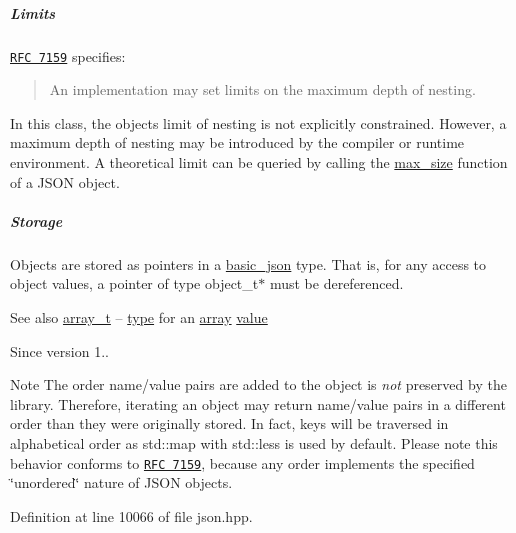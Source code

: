 \subparagraph*{Limits}

\href{http://rfc7159.net/rfc7159}{\tt R\+FC 7159} specifies\+: \begin{quote}
An implementation may set limits on the maximum depth of nesting. \end{quote}


In this class, the object\textquotesingle{}s limit of nesting is not explicitly constrained. However, a maximum depth of nesting may be introduced by the compiler or runtime environment. A theoretical limit can be queried by calling the \hyperlink{classnlohmann_1_1basic__json_a2f47d3c6a441c57dd2be00449fbb88e1}{max\+\_\+size} function of a J\+S\+ON object.

\subparagraph*{Storage}

Objects are stored as pointers in a \hyperlink{classnlohmann_1_1basic__json}{basic\+\_\+json} type. That is, for any access to object values, a pointer of type {\ttfamily object\+\_\+t$\ast$} must be dereferenced.

\begin{DoxySeeAlso}{See also}
\hyperlink{classnlohmann_1_1basic__json_ae095578e03df97c5b3991787f1056374}{array\+\_\+t} -- \hyperlink{classnlohmann_1_1basic__json_a2b2d781d7f2a4ee41bc0016e931cadf7}{type} for an \hyperlink{classnlohmann_1_1basic__json_aa80485befaffcadaa39965494e0b4d2e}{array} \hyperlink{classnlohmann_1_1basic__json_adcf8ca5079f5db993820bf50036bf45d}{value}
\end{DoxySeeAlso}
\begin{DoxySince}{Since}
version 1..
\end{DoxySince}
\begin{DoxyNote}{Note}
The order name/value pairs are added to the object is {\itshape not} preserved by the library. Therefore, iterating an object may return name/value pairs in a different order than they were originally stored. In fact, keys will be traversed in alphabetical order as {\ttfamily std\+::map} with {\ttfamily std\+::less} is used by default. Please note this behavior conforms to \href{http://rfc7159.net/rfc7159}{\tt R\+FC 7159}, because any order implements the specified \char`\"{}unordered\char`\"{} nature of J\+S\+ON objects. 
\end{DoxyNote}


Definition at line 10066 of file json.\+hpp.

\mbox{\label{classnlohmann_1_1basic__json_a3333a5a8714912adda33a35b369f7b3d}} 
